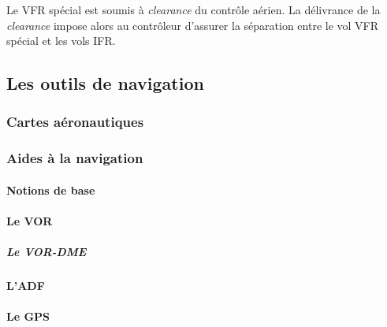 		Le VFR spécial est soumis à \textit{clearance} du contrôle aérien. La délivrance de la \textit{clearance} impose alors au contrôleur d'assurer la séparation entre le vol VFR spécial et les vols IFR.
		
	
	\subsection{Les outils de navigation}
		\subsubsection{Cartes aéronautiques}
		
		\subsubsection{Aides à la navigation}
			\paragraph{Notions de base}
			
			\paragraph{Le VOR}
			
			\subparagraph{Le VOR-DME}
			
			\paragraph{L'ADF}
			
			\paragraph{Le GPS}